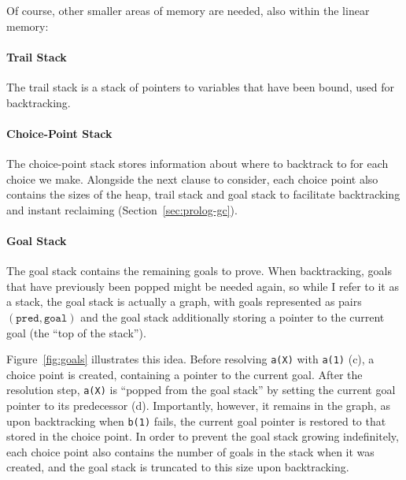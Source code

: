 Of course, other smaller areas of memory are needed, also within the linear memory:

\paragraph{Trail Stack} The trail stack is a stack of pointers to variables that have been bound, used for backtracking.

\paragraph{Choice-Point Stack} The choice-point stack stores information about where to backtrack to for each choice we make. Alongside the next clause to consider, each choice point also contains the sizes of the heap, trail stack and goal stack to facilitate backtracking and instant reclaiming (Section~\ref{sec:prolog-gc}).

\paragraph{Goal Stack} The goal stack contains the remaining goals to prove. When backtracking, goals that have previously been popped might be needed again, so while I refer to it as a stack, the goal stack is actually a graph, with goals represented as pairs $(\texttt{pred}, \texttt{goal})$ and the goal stack additionally storing a pointer to the current goal (the ``top of the stack'').

Figure~\ref{fig:goals} illustrates this idea. Before resolving \texttt{a(X)} with \texttt{a(1)} (c), a choice point is created, containing a pointer to the current goal. After the resolution step, \texttt{a(X)} is ``popped from the goal stack'' by setting the current goal pointer to its predecessor (d). Importantly, however, it remains in the graph, as upon backtracking when \texttt{b(1)} fails, the current goal pointer is restored to that stored in the choice point. In order to prevent the goal stack growing indefinitely, each choice point also contains the number of goals in the stack when it was created, and the goal stack is truncated to this size upon backtracking.

